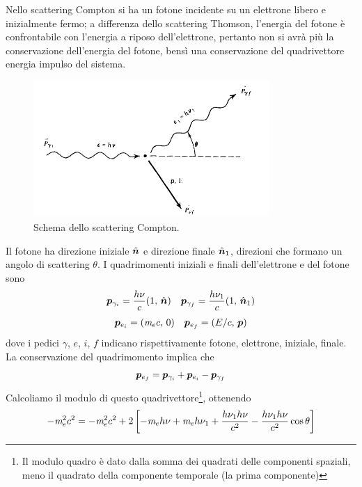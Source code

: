 Nello scattering Compton si ha un fotone incidente su un elettrone libero e inizialmente fermo; a differenza dello scattering Thomson, l'energia del fotone è confrontabile con l'energia a riposo dell'elettrone, pertanto non si avrà più la conservazione dell'energia del fotone, bensì una conservazione del quadrivettore energia impulso del sistema. 
\begin{figure}
\begin{center}
\includegraphics[width=0.8\textwidth]{img/Compton}
\caption{Schema dello scattering Compton.}
\end{center}
\end{figure}
Il fotone ha direzione iniziale $\vers{n}$ e direzione finale $\vers{n}_1$, direzioni che formano un angolo di scattering $\theta$. I quadrimomenti iniziali e finali dell'elettrone e del fotone sono
\begin{align}
&\V{p}_{\gamma_i} = \dfrac{h\nu}{c}(1,\,\vers{n})
&\V{p}_{\gamma_f} = \dfrac{h\nu_1}{c}(1,\,\vers{n}_1)
\end{align}
\begin{align}
&\V{p}_{e_i} = (\mel c, \, 0)
&\V{p}_{e_f} = (E/c,\,\V{p})
\end{align}
dove i pedici $\gamma$, $e$, $i$, $f$ indicano rispettivamente fotone, elettrone, iniziale, finale. La conservazione del quadrimomento implica che 
\begin{equation}
\V{p}_{e_f} = \V{p}_{\gamma_i} + \V{p}_{e_i} - \V{p}_{\gamma_f}
\end{equation}
Calcoliamo il modulo di questo quadrivettore\footnote{Il modulo quadro è dato dalla somma dei quadrati delle componenti spaziali, meno il quadrato della componente temporale (la prima componente)}, ottenendo
\begin{equation}
-\textit{m}_{e}^2 c^2 = -\textit{m}_{e}^2 c^2 + 2\left[ -\textit{m}_{e} h \nu + \textit{m}_{e} h \nu_1 + \dfrac{h\nu_1 h \nu}{c^2} - \dfrac{h\nu_1 h \nu}{c^2} \cos\theta \right]
\end{equation}
